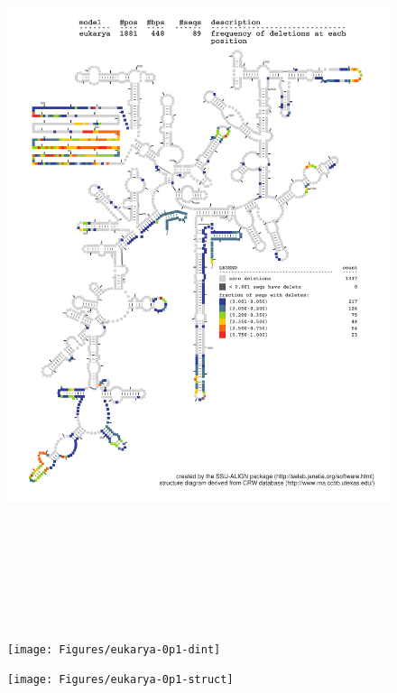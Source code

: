 \begin{figure}
\includegraphics[height=8.5in]{Figures/eukarya-0p1-dall}
\label{fig:eukinfo}
\end{figure}

\newpage

\begin{figure}
\texttt{[image: Figures/eukarya-0p1-dint]}
\label{fig:eukinfo}
\end{figure}

\newpage

\begin{figure}
\texttt{[image: Figures/eukarya-0p1-struct]}
\label{fig:eukinfo}
\end{figure}


